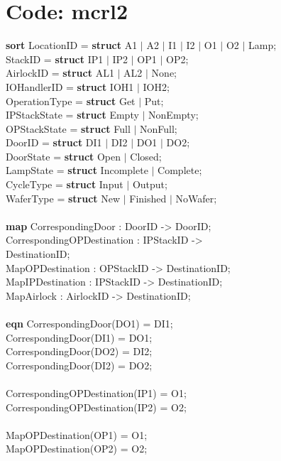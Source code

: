 \documentclass[a4paper,12pt]{article}
\begin{document}
	\section{Code: mcrl2}
	\textbf{sort} LocationID = \textbf{struct} A1 $|$ A2 $|$ I1 $|$ I2 $|$ O1 $|$ O2 $|$ Lamp;
	\\		  StackID = \textbf{struct} IP1 $|$ IP2 $|$ OP1 $|$ OP2;
	\\		  AirlockID = \textbf{struct} AL1 $|$ AL2 $|$ None;
	\\     IOHandlerID = \textbf{struct} IOH1 $|$ IOH2;
	\\		  OperationType = \textbf{struct} Get $|$ Put;
	\\		  IPStackState = \textbf{struct} Empty $|$ NonEmpty;
	\\		  OPStackState = \textbf{struct} Full $|$ NonFull;
	\\	    DoorID = \textbf{struct} DI1 $|$ DI2 $|$ DO1 $|$ DO2;		
	\\		  DoorState = \textbf{struct} Open $|$ Closed;
	\\			LampState = \textbf{struct} Incomplete $|$ Complete;
	\\		  CycleType = \textbf{struct} Input $|$ Output;
	\\		  WaferType = \textbf{struct} New $|$ Finished $|$ NoWafer;
	\\
	\\\textbf{map} CorrespondingDoor : DoorID -> DoorID;
	\\	  CorrespondingOPDestination : IPStackID -> \\DestinationID;		
	\\	  MapOPDestination : OPStackID -> DestinationID;
	\\		MapIPDestination : IPStackID -> DestinationID;
	\\		MapAirlock : AirlockID -> DestinationID;
	\\
	\\ \textbf{eqn} CorrespondingDoor(DO1) = DI1;
	\\		CorrespondingDoor(DI1) = DO1;
	\\		CorrespondingDoor(DO2) = DI2;
	\\		CorrespondingDoor(DI2) = DO2;
	\\
	\\		CorrespondingOPDestination(IP1) = O1;
	\\		CorrespondingOPDestination(IP2) = O2;
	\\
	\\		MapOPDestination(OP1) = O1;
	\\		MapOPDestination(OP2) = O2;
\end{document}
